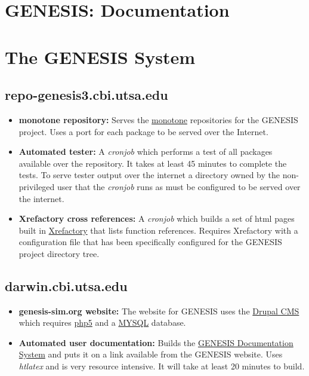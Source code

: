 \documentclass[12pt]{article}
\begin{document}
\section*{GENESIS: Documentation}

\section*{The GENESIS System}

\subsection*{\bf repo-genesis3.cbi.utsa.edu}

\begin{itemize}

\item {\bf monotone repository:} Serves the \href{http://www.monotone.ca/}{monotone} repositories for the GENESIS project. Uses a port for each package to be served over the Internet.

\item {\bf Automated tester:} A {\it cronjob} which performs a test of all packages available over the repository.  It takes at least 45 minutes to complete the tests. To serve tester output over the internet a directory owned by the non-privileged user that the {\it cronjob} runs as must be configured to be served over the internet. 

\item {\bf Xrefactory cross references:} A {\it cronjob} which builds a set of html pages built in \href{http://www.xref-tech.com/xrefactory/main.html}{Xrefactory} that lists function references.  Requires Xrefactory with a configuration file that has been specifically configured for the GENESIS project directory tree. 

\end{itemize}

\subsection*{\bf darwin.cbi.utsa.edu}

\begin{itemize}

\item {\bf genesis-sim.org website:} The website for GENESIS uses the \href{http://drupal.org/}{Drupal CMS} which requires \href{http://www.php.net/}{php5} and a \href{http://www.mysql.com/}{MYSQL} database.

\item {\bf Automated user documentation:} Builds the \href{../documentation-overview/documentation-overview.tex}{GENESIS Documentation System} and puts it on a link available from the GENESIS website.  Uses {\it htlatex} and is very resource intensive.  It will take at least 20 minutes to build.

\end{itemize}
\end{document}
